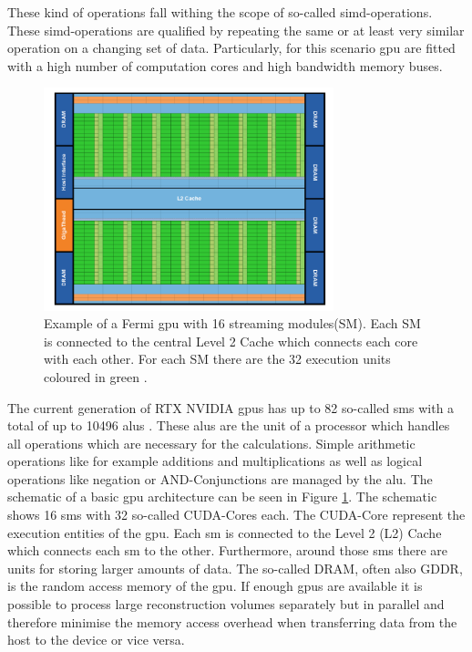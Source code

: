 These kind of operations fall withing the scope of so-called \ac{simd}-operations. These \ac{simd}-operations are qualified by repeating the same or at least very similar operation on a changing set of data. Particularly, for this scenario \ac{gpu} are fitted with a high number of computation cores and high bandwidth memory buses.


\begin{figure}[H]
    \centering
    \includegraphics[width=0.75\textwidth]{Graphics/gpu_example.png}
    \caption{Example of a Fermi \ac{gpu} with 16 streaming modules(SM). Each SM is connected to the central Level 2 Cache which connects each core with each other. For each SM there are the 32 execution units coloured in green \cite{nvid_whitepaper}.}
    \label{nvidiea_aufbau}
\end{figure}


The current generation of RTX NVIDIA \acp{gpu} has up to 82 so-called \acp{sm} with a total of up to 10496 \acp{alu} \cite{gpu_stats}. These \acp{alu} are the unit of a processor which handles all operations which are necessary for the calculations. Simple arithmetic operations like for example additions and multiplications as well as logical operations like negation or AND-Conjunctions are managed by the \ac{alu}. The schematic of a basic \ac{gpu} architecture can be seen in Figure \ref{nvidiea_aufbau}. The schematic shows 16 \acp{sm} with 32 so-called CUDA-Cores each. The CUDA-Core represent the execution entities of the \ac{gpu}. Each \ac{sm} is connected to the Level 2 (L2) Cache which connects each \ac{sm} to the other. Furthermore, around those \acp{sm} there are units for storing larger amounts of data. The so-called DRAM, often also GDDR, is the random access memory of the \ac{gpu}. If enough \acp{gpu} are available it is possible to process large reconstruction volumes separately but in parallel and therefore minimise the memory access overhead when transferring data from the host to the device or vice versa.


